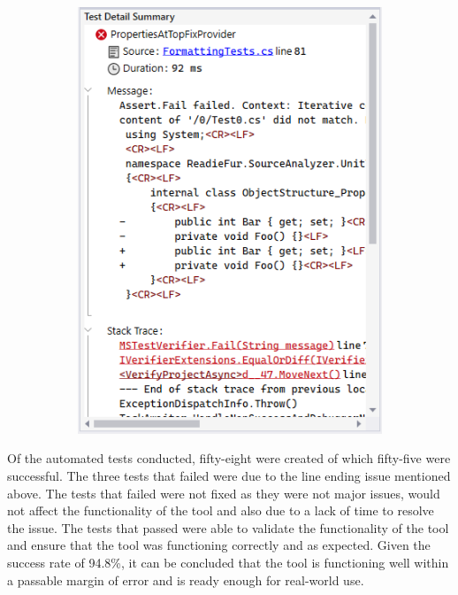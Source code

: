 \begin{figure}[H]
\begin{subfigure}[t]{0.35\textwidth}
        \includegraphics[width=\linewidth, height=0.35\textheight, keepaspectratio]{Figures/UnitTestFailing.png}
    \end{subfigure}
\end{figure}

Of the automated tests conducted, fifty-eight were created of which fifty-five were successful. The three tests that failed were due to the line ending issue mentioned above. The tests that failed were not fixed as they were not major issues, would not affect the functionality of the tool and also due to a lack of time to resolve the issue. The tests that passed were able to validate the functionality of the tool and ensure that the tool was functioning correctly and as expected. Given the success rate of 94.8\%, it can be concluded that the tool is functioning well within a passable margin of error and is ready enough for real-world use.


